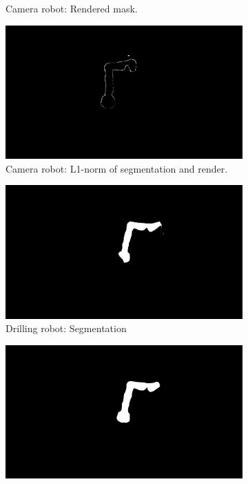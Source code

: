 \begin{figure}[tb]
\begin{subfigure}[b]{0.32\textwidth}
        \caption{Camera robot: Rendered mask.}
    \end{subfigure}
    \begin{subfigure}[b]{0.32\textwidth}
        \includegraphics[width=\textwidth]{chapter_1/img/hsi_left_difference_2.png}
        \caption{Camera robot: L1-norm of segmentation and render.}
    \end{subfigure}
    \begin{subfigure}[b]{0.32\textwidth}
        \includegraphics[width=\textwidth]{chapter_1/img/drill_left_mask_1.png}
        \caption{Drilling robot: Segmentation}
    \end{subfigure}
    \begin{subfigure}[b]{0.32\textwidth}
        \includegraphics[width=\textwidth]{chapter_1/img/drill_left_render_mask_1.png}

\end{subfigure}
\end{figure}
